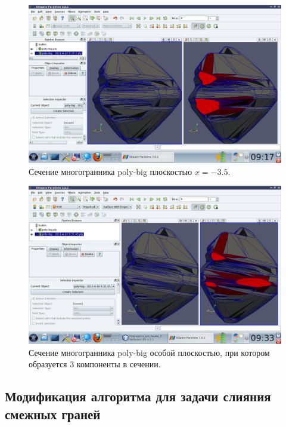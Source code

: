 \documentclass[a4paper,12pt, titlepage]{article}
\begin{document}
	\begin{flushleft}
		\begin{figure}[p]
		    \includegraphics[trim = 220 65 10 140, clip, width=15cm]{poly-big/35.png}
		    \caption{Сечение многогранника poly-big плоскостью $x = -3.5$.}
		    \label{poly-big-5}
		\end{figure}

	\end{flushleft}
	\begin{flushleft}
		\begin{figure}[p]
		    \includegraphics[trim = 350 65 10 140, clip, width=15cm]{poly-big/3components.png}
		    \caption{Сечение многогранника poly-big особой плоскостью, при котором образуется 3 компоненты в 
		    сечении.}
		    \label{poly-big-6}
		\end{figure}
	\end{flushleft}

\newpage
\subsection{Модификация алгоритма для задачи слияния смежных граней}
\end{document}
